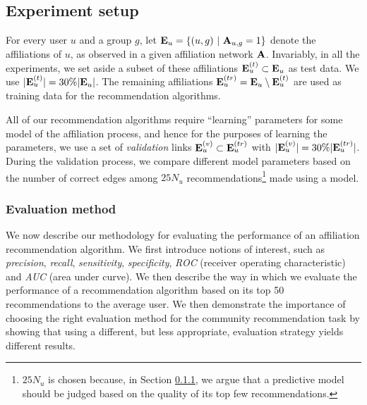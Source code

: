 \subsection{Experiment setup}
For every user $u$ and a group $g$, let $\mathbf{E}_u = \left\{ (u,g) \ | \ \mathbf{A}_{u,g} = 1 \right\}$ denote the affiliations of $u$, as observed in a given affiliation network $\mathbf{A}$. Invariably, in all the experiments, we set aside a subset of these affiliations $\mathbf{E}_{u}^{(t)} \subset \mathbf{E}_u$ as test data. We use $|\mathbf{E}_u^{(t)}| = 30 \% |\mathbf{E}_u|$. The remaining affiliations $\mathbf{E}_u^{(tr)} = \mathbf{E}_u \setminus \mathbf{E}_u^{(t)}$ are used as training data for the recommendation algorithms.

All of our recommendation algorithms require ``learning'' parameters for some model of the affiliation process, and hence for the purposes of learning the parameters, we use a set of \textit{validation} links $\mathbf{E}_u^{(v)} \subset \mathbf{E}_u^{(tr)}$ with $|\mathbf{E}_u^{(v)}| = 30 \% |\mathbf{E}_u^{(tr)}|$. During the validation process, we compare different model parameters based on the number of correct edges among $25 N_u$ recommendations\footnote{$25 N_u$  is chosen because, in Section \ref{Evaluation method}, we argue that a predictive model should be judged based on the quality of its top few recommendations.} made using a model.

\subsubsection{Evaluation method}
\label{Evaluation method}
We now describe our methodology for evaluating the performance of an affiliation recommendation algorithm. We first introduce notions of interest, such as \textit{precision}, \textit{recall}, \textit{sensitivity}, \textit{specificity}, \textit{ROC} (receiver operating characteristic) and \textit{AUC} (area under curve). We then describe the way in which we evaluate the performance of a recommendation algorithm based on its top 50 recommendations to the average user. We then demonstrate the importance of choosing the right evaluation method for the community recommendation task by showing that using a different, but less appropriate, evaluation strategy yields different results.

